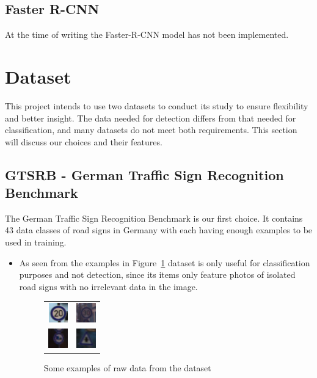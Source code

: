 \documentclass[12pt, landscape]{article}
\begin{document}
\begin{multicols}{3}
\subsection{Faster R-CNN}
At the time of writing the Faster-R-CNN model has not been implemented.

\section{Dataset}
This project intends to use two datasets to conduct its study to ensure
flexibility and better insight. The data needed for detection differs from that
needed for classification, and many datasets do not meet both requirements. This
section will discuss our choices and their features.
\subsection{GTSRB - German Traffic Sign Recognition Benchmark}
The German Traffic Sign Recognition Benchmark is our first choice. It contains
43 data classes of road signs in Germany with each having enough examples to be
used in training.

\begin{itemize}
    \item As seen from the examples in Figure~\ref{fig:ex} dataset is only
    useful for classification purposes and not detection, since its items only
    feature photos of isolated road signs with no irrelevant data in the image.
    \begin{figure}[H]
        \centering
        \begin{tabular}{cc}
        \includegraphics[scale=1.3]{ex1.png}&\includegraphics[scale=1.3]{ex2.png}\\
        \includegraphics[scale=1.3]{ex3.png}&\includegraphics[scale=1.3]{ex4.png}\\
        \end{tabular}
        \caption{Some examples of raw data from the dataset}
        \label{fig:ex}
    \end{figure}


\end{itemize}
\end{multicols}
\end{document}
